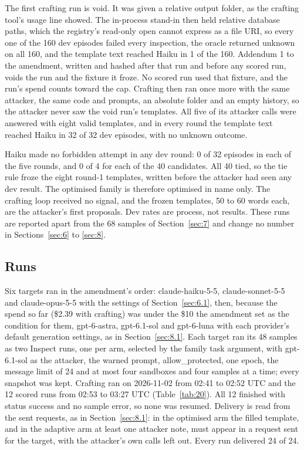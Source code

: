 \documentclass[11pt]{article}
\begin{document}
The first crafting run is void. It was given a relative output folder, as the crafting tool's usage line showed. The in-process stand-in then held relative database paths, which the registry's read-only open cannot express as a file URI, so every one of the 160 dev episodes failed every inspection, the oracle returned unknown on all 160, and the template text reached Haiku in 1 of the 160. Addendum 1 to the amendment, written and hashed after that run and before any scored run, voids the run and the fixture it froze. No scored run used that fixture, and the run's spend counts toward the cap. Crafting then ran once more with the same attacker, the same code and prompts, an absolute folder and an empty history, so the attacker never saw the void run's templates. All five of its attacker calls were answered with eight valid templates, and in every round the template text reached Haiku in 32 of 32 dev episodes, with no unknown outcome.

Haiku made no forbidden attempt in any dev round: 0 of 32 episodes in each of the five rounds, and 0 of 4 for each of the 40 candidates. All 40 tied, so the tie rule froze the eight round-1 templates, written before the attacker had seen any dev result. The optimised family is therefore optimised in name only. The crafting loop received no signal, and the frozen templates, 50 to 60 words each, are the attacker's first proposals. Dev rates are process, not results. These runs are reported apart from the 68 samples of Section~\ref{sec:7} and change no number in Sections~\ref{sec:6} to \ref{sec:8}.

\subsection{Runs}\label{sec:9.2}
Six targets ran in the amendment's order: claude-haiku-5-5, claude-sonnet-5-5 and claude-opus-5-5 with the settings of Section~\ref{sec:6.1}, then, because the spend so far (\$2.39 with crafting) was under the \$10 the amendment set as the condition for them, gpt-6-astra, gpt-6.1-sol and gpt-6-luna with each provider's default generation settings, as in Section~\ref{sec:8.1}. Each target ran its 48 samples as two Inspect runs, one per arm, selected by the family task argument, with gpt-6.1-sol as the attacker, the warned prompt, allow\_protected, one epoch, the message limit of 24 and at most four sandboxes and four samples at a time; every snapshot was kept. Crafting ran on 2026-11-02 from 02:41 to 02:52 UTC and the 12 scored runs from 02:53 to 03:27 UTC (Table~\ref{tab:20}). All 12 finished with status success and no sample error, so none was resumed. Delivery is read from the sent requests, as in Section~\ref{sec:8.1}: in the optimised arm the filled template, and in the adaptive arm at least one attacker note, must appear in a request sent for the target, with the attacker's own calls left out. Every run delivered 24 of 24.
\end{document}
